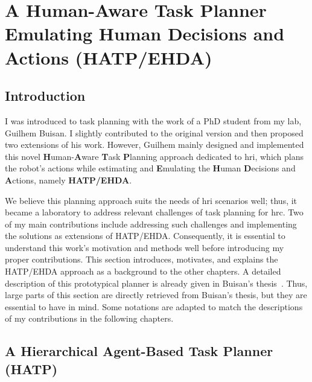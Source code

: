 \ifdefined{}
\else
\setcounter{chapter}{1} %
\dominitoc
\faketableofcontents
\fi

\chapter{A Human-Aware Task Planner Emulating Human Decisions and Actions (HATP/EHDA)}
\label{chap:2}
\minitoc


\section{Introduction}

I was introduced to task planning with the work of a PhD student from my lab, Guilhem Buisan. I slightly contributed to the original version and then proposed two extensions of his work. However, Guilhem mainly designed and implemented this novel \textbf{H}uman-\textbf{A}ware \textbf{T}ask \textbf{P}lanning approach dedicated to \acrfull{hri}, which plans the robot's actions while estimating and \textbf{E}mulating the \textbf{H}uman \textbf{D}ecisions and \textbf{A}ctions, namely \textbf{HATP/EHDA}. 

We believe this planning approach suits the needs of \acrshort{hri} scenarios well; thus, it became a laboratory to address relevant challenges of task planning for \acrshort{hrc}. 
Two of my main contributions include addressing such challenges and implementing the solutions as extensions of HATP/EHDA.   
Consequently, it is essential to understand this work's motivation and methods well before introducing my proper contributions. This section introduces, motivates, and explains the HATP/EHDA approach as a background to the other chapters. 
A detailed description of this prototypical planner is already given in Buisan's thesis~\cite{thesisBuisan21}. Thus, large parts of this section are directly retrieved from Buisan's thesis, but they are essential to have in mind. Some notations are adapted to match the descriptions of my contributions in the following chapters. 

\section{A Hierarchical Agent-Based Task Planner (HATP)}

